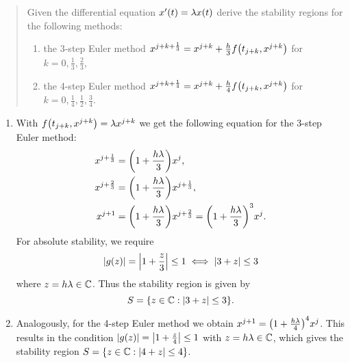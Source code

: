 \documentclass{exercise}
\begin{document}
	\section{}

	\begin{quote}
		Given the differential equation \(x'\parentheses*{t} = \lambda x\parentheses*{t}\) derive the stability regions for the following methods:
		\begin{enumerate}
			\item the 3-step Euler method \(x^{j + k + \frac{1}{3}} = x^{j + k} + \frac{h}{3}f\parentheses*{t_{j + k}, x^{j + k}}\) for \(k = 0, \frac{1}{3}, \frac{2}{3}\),
			\item the 4-step Euler method \(x^{j + k + \frac{1}{4}} = x^{j + k} + \frac{h}{4}f\parentheses*{t_{j + k}, x^{j + k}}\) for \(k = 0, \frac{1}{4}, \frac{1}{2}, \frac{3}{4}\).
		\end{enumerate}
	\end{quote}

	\begin{enumerate}
		\item With \(f\parentheses*{t_{j + k}, x^{j + k}} = \lambda x^{j + k}\) we get the following equation for the 3-step Euler method:
		\begin{align*}
			x^{j + \frac{1}{3}} &= \parentheses*{1 + \frac{h\lambda}{3}}x^j,\\
			x^{j + \frac{2}{3}} &= \parentheses*{1 + \frac{h\lambda}{3}}x^{j + \frac{1}{3}},\\
			x^{j + 1} &= \parentheses*{1 + \frac{h\lambda}{3}}x^{j + \frac{2}{3}} = \parentheses*{1 + \frac{h\lambda}{3}}^3 x^j.
		\end{align*}
		For absolute stability, we require
		\[
			\absolute*{g\parentheses*{z}} = \absolute*{1 + \frac{z}{3}} \le 1 \iff \absolute*{3 + z} \le 3
		\]
		where \(z = h\lambda \in \C\).
		Thus the stability region is given by
		\[
			S = \braces*{z \in \C : \absolute*{3 + z} \le 3}.
		\]
		\item Analogously, for the 4-step Euler method we obtain \(x^{j + 1} = \parentheses*{1 + \frac{h\lambda}{4}}^4 x^j\).
		This results in the condition \(\absolute*{g\parentheses*{z}} = \absolute*{1 + \frac{z}{4}} \le 1\) with \(z = h\lambda \in \C\), which gives the stability region \(S = \braces*{z \in \C : \absolute*{4 + z} \le 4}\).
	\end{enumerate}


	\section{}
\end{document}
